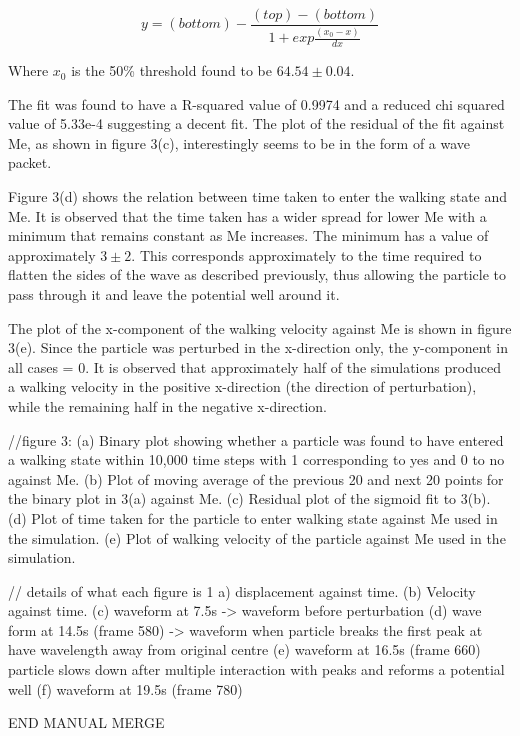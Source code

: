 \begin{equation}
y = (bottom) - \frac{(top)-(bottom)}{1+exp \frac{\left(x_0 - x \right)}{dx}}
\end{equation}

Where $x_0$ is the 50\% threshold found to be $64.54\pm0.04$.

The fit was found to have a R-squared value of 0.9974 and a reduced chi squared value of 5.33e-4 suggesting a decent fit. The plot of the residual of the fit against Me, as shown in figure 3(c), interestingly seems to be in the form of a wave packet. 

Figure 3(d) shows the relation between time taken to enter the walking state and Me. It is observed that the time taken has a wider spread for lower Me with a minimum that remains constant as Me increases. The minimum has a value of approximately $3\pm2$. This corresponds approximately to the time required to flatten the sides of the wave as described previously, thus allowing the particle to pass through it and leave the potential well around it.

The plot of the x-component of the walking velocity against Me is shown in figure 3(e). Since the particle was perturbed in the x-direction only, the y-component in all cases = 0. It is observed that approximately half of the simulations produced a walking velocity in the positive x-direction (the direction of perturbation), while the remaining half in the negative x-direction. 

//figure 3: (a) Binary plot showing whether a particle was found to have entered a walking state within 10,000 time steps with 1 corresponding to yes and 0 to no against Me. (b) Plot of moving average of the previous 20 and next 20 points for the binary plot in 3(a) against  Me. (c) Residual plot of the sigmoid fit to 3(b). (d) Plot of time taken for the particle to enter walking state against Me used in the simulation. (e) Plot of walking velocity of the particle against Me used in the simulation. 


// details of what each figure is
1 a) displacement against time. (b) Velocity against time. (c) waveform at 7.5s -> waveform before perturbation (d) wave form at 14.5s (frame 580) -> waveform when particle breaks the first peak at have wavelength away from original centre (e) waveform at 16.5s (frame 660) particle slows down after multiple interaction with peaks and reforms a potential well (f) waveform at 19.5s (frame 780)

END MANUAL MERGE